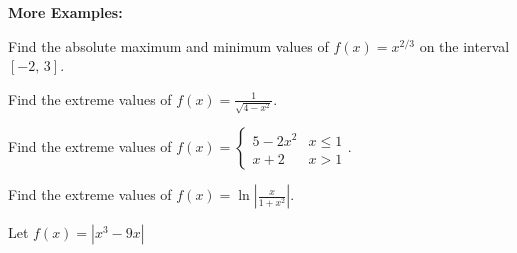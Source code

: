 \noindent\textbf{More Examples:}
\begin{questions}
    \question Find the absolute maximum and minimum values of $f(x)=x^{2/3}$ on the interval $[-2,\,3]$.
    
    \question Find the extreme values of  $\displaystyle f(x)=\frac{1}{\sqrt{4-x^2}}$.
    
    \question Find the extreme values of $\displaystyle f(x)=\begin{cases}
    5-2x^2 & x\le1\\ x+2 & x>1
    \end{cases}$.
    
    \question Find the extreme values of $\displaystyle f(x)=\ln\left|\frac{x}{1+x^2}\right|$.
    
    \question Let $f(x)=|x^3-9x|$
\end{questions}

\newpage

